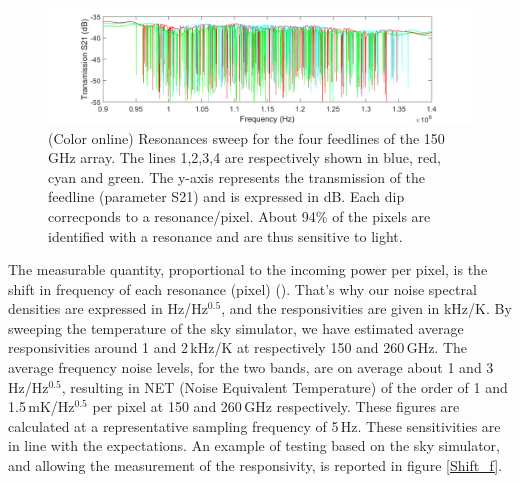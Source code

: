 \documentclass[]{aa} %
\begin{document}
\begin{figure}[h]
\begin{center}
   \centering
    \includegraphics[width=1.05\linewidth]{VNA_scans_150GHz.png}
    \caption{(Color online) Resonances sweep for the four feedlines of the 150\,GHz array. The lines 1,2,3,4 are respectively shown in blue, red, cyan and green. The y-axis represents the transmission of the feedline (parameter S21) and is expressed in dB. Each dip correcponds to a resonance/pixel. About 94\% of the pixels are identified with a resonance and are thus sensitive to light.}
         \label{VNA}
\end{center}
\end{figure}

The measurable quantity, proportional to the incoming power per pixel, is the shift in frequency of each resonance (pixel) (\cite{Swenson2010}). That's why our noise spectral densities are expressed in Hz/Hz$^{0.5}$, and the responsivities are given in kHz/K. By sweeping the temperature of the sky simulator, we have estimated average responsivities around 1 and 2\,kHz/K at respectively 150 and 260\,GHz. The average frequency noise levels, for the two bands, are on average about 1 and 3\,Hz/Hz$^{0.5}$, resulting in NET (Noise Equivalent Temperature) of the order of 1 and 1.5\,mK/Hz$^{0.5}$ per pixel at 150 and 260\,GHz respectively. These figures are calculated at a representative sampling frequency of 5\,Hz. 
These sensitivities are in line with the expectations. An example of testing based on the sky simulator, and allowing the measurement of the responsivity, is reported in figure \ref{Shift_f}. 
\end{document}
